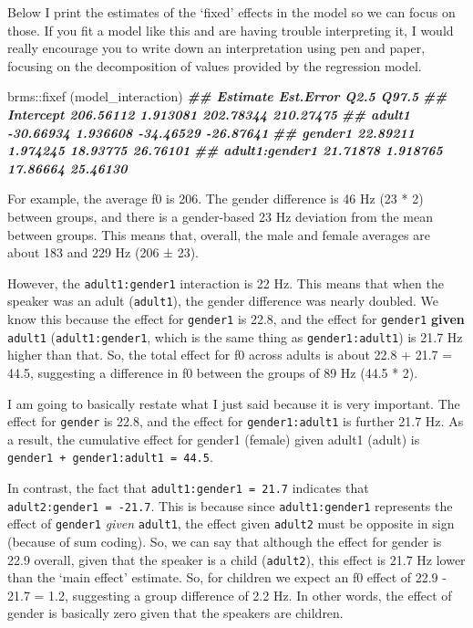 \documentclass[
]{book}
\newenvironment{Shaded}{\begin{snugshade}}{\end{snugshade}}
\newcommand{\DocumentationTok}[1]{\textcolor[rgb]{0.56,0.35,0.01}{\textbf{\textit{#1}}}}
\newcommand{\FunctionTok}[1]{\textcolor[rgb]{0.00,0.00,0.00}{#1}}
\newcommand{\NormalTok}[1]{#1}
\newcommand{\SpecialCharTok}[1]{\textcolor[rgb]{0.00,0.00,0.00}{#1}}
\begin{document}
Below I print the estimates of the `fixed' effects in the model so we can focus on those. If you fit a model like this and are having trouble interpreting it, I would really encourage you to write down an interpretation using pen and paper, focusing on the decomposition of values provided by the regression model.

\begin{Shaded}
\begin{Highlighting}[]
\NormalTok{brms}\SpecialCharTok{::}\FunctionTok{fixef}\NormalTok{ (model\_interaction)}
\DocumentationTok{\#\#                 Estimate Est.Error      Q2.5     Q97.5}
\DocumentationTok{\#\# Intercept      206.56112  1.913081 202.78344 210.27475}
\DocumentationTok{\#\# adult1         {-}30.66934  1.936608 {-}34.46529 {-}26.87641}
\DocumentationTok{\#\# gender1         22.89211  1.974245  18.93775  26.76101}
\DocumentationTok{\#\# adult1:gender1  21.71878  1.918765  17.86664  25.46130}
\end{Highlighting}
\end{Shaded}

For example, the average f0 is 206. The gender difference is 46 Hz (23 * 2) between groups, and there is a gender-based 23 Hz deviation from the mean between groups. This means that, overall, the male and female averages are about 183 and 229 Hz (206 ± 23).

However, the \texttt{adult1:gender1} interaction is 22 Hz. This means that when the speaker was an adult (\texttt{adult1}), the gender difference was nearly doubled. We know this because the effect for \texttt{gender1} is 22.8, and the effect for \texttt{gender1} \textbf{given} \texttt{adult1} (\texttt{adult1:gender1}, which is the same thing as \texttt{gender1:adult1}) is 21.7 Hz higher than that. So, the total effect for f0 across adults is about 22.8 + 21.7 = 44.5, suggesting a difference in f0 between the groups of 89 Hz (44.5 * 2).

I am going to basically restate what I just said because it is very important. The effect for \texttt{gender} is 22.8, and the effect for \texttt{gender1:adult1} is further 21.7 Hz. As a result, the cumulative effect for gender1 (female) given adult1 (adult) is \texttt{gender1\ +\ gender1:adult1\ =\ 44.5}.

In contrast, the fact that \texttt{adult1:gender1\ =\ 21.7} indicates that \texttt{adult2:gender1\ =\ -21.7}. This is because since \texttt{adult1:gender1} represents the effect of \texttt{gender1} \emph{given} \texttt{adult1}, the effect given \texttt{adult2} must be opposite in sign (because of sum coding). So, we can say that although the effect for gender is 22.9 overall, given that the speaker is a child (\texttt{adult2}), this effect is 21.7 Hz lower than the `main effect' estimate. So, for children we expect an f0 effect of 22.9 - 21.7 = 1.2, suggesting a group difference of 2.2 Hz. In other words, the effect of gender is basically zero given that the speakers are children.
\end{document}
